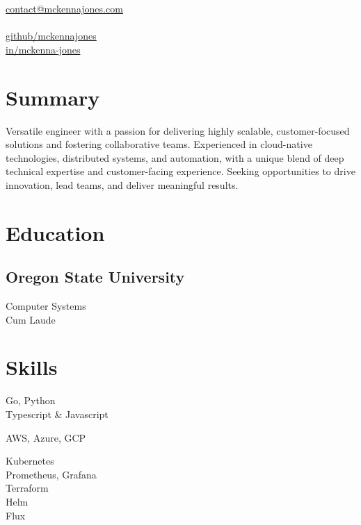 \documentclass[]{hieudo-build}
\begin{document}
%
%
{
	\faEnvelope \href{mailto:contact@mckennajones.com}{ contact@mckennajones.com}\\
	 \\
	\faGithub \href{https://github.com/mckennajones}{   github/mckennajones}\\
	\faLinkedin \href{https://www.linkedin.com/in/mckenna-jones}{   in/mckenna-jones}}
    
%
%
\begin{minipage}[t]{0.25\textwidth} 

\section{Summary} 
Versatile engineer with a passion for delivering highly scalable, customer-focused solutions and fostering collaborative teams. Experienced in cloud-native technologies, distributed systems, and automation, with a unique blend of deep technical expertise and customer-facing experience. Seeking opportunities to drive innovation, lead teams, and deliver meaningful results.\vspace{15pt}
\section{Education} 

\subsection{Oregon State University}
Computer Systems \\
Cum Laude\\

\vspace{15pt}
\section{Skills}
Go, Python\\
Typescript \& Javascript
\sectionsep

AWS, Azure, GCP
\sectionsep

Kubernetes\\
Prometheus, Grafana\\
Terraform\\
Helm\\
Flux
\sectionsep

%
%
\end{minipage} 
\end{document}
